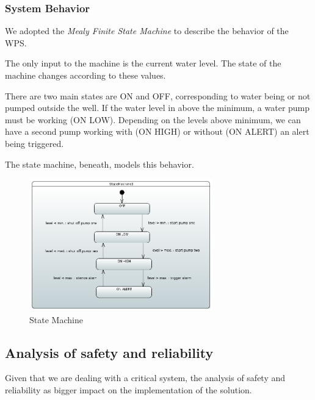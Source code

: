 \documentclass[11pt]{article}
\begin{document}
\newpage

\subsubsection{System Behavior}

We adopted the \textit{Mealy Finite State Machine} to describe the behavior of the WPS.

The only input to the machine is the current water level. The state of the machine changes according to these values.

There are two main states are ON and OFF, corresponding to water being or not pumped outside the well. If the water level in above the minimum, a water pump must be working (ON LOW). Depending on the levels above minimum, we can have a second pump working with (ON HIGH) or without (ON ALERT) an alert being triggered.

The state machine, beneath, models this behavior.

\begin{figure}[H]
  \centering
  \includegraphics[width=300px]{../diagrams/state-machine-wps.png}
  \caption{State Machine}
  \label{fig:State Machine}
\end{figure}


\subsection{Analysis of safety and reliability}

Given that we are dealing with a critical system, the analysis of safety and reliability as bigger impact on the implementation of the solution.
\end{document}
